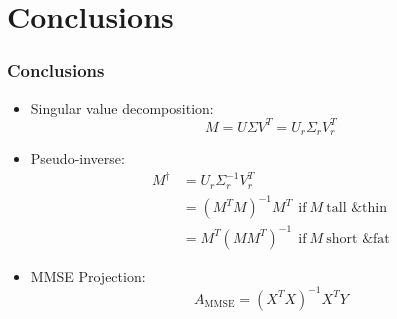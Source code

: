 \documentclass{beamer}
\begin{document}
    
\section{Conclusions}
\setcounter{subsection}{1}
\begin{frame}
  \frametitle{Conclusions}
  \begin{itemize}
  \item Singular value decomposition:
    \begin{displaymath}
      M = U\Sigma V^T = U_r\Sigma_rV_r^T
    \end{displaymath}
  \item Pseudo-inverse:
    \begin{align*}
      M^\dag &= U_r\Sigma_r^{-1}V_r^T\\
      &= (M^TM)^{-1}M^T~~\text{if}~M~\text{tall \& thin}\\
      &= M^T(MM^T)^{-1}~~\text{if}~M~\text{short \& fat}
    \end{align*}
  \item MMSE Projection:
    \begin{displaymath}
      A_{\text{MMSE}}=(X^TX)^{-1}X^TY
    \end{displaymath}
  \end{itemize}
\end{frame}
\end{document}
